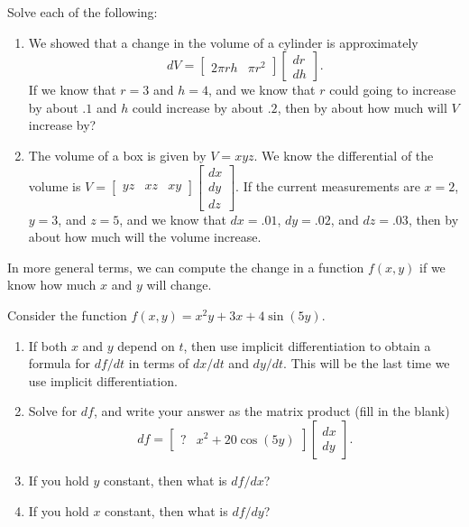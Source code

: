 \begin{problem}
Solve each of the following:
\begin{enumerate}
 \item{}%
 We showed that a change in the volume of a cylinder is approximately
 $$dV = \begin{bmatrix}2\pi rh& \pi r^2\end{bmatrix}\begin{bmatrix}dr\\dh\end{bmatrix}.$$ 
 If we know that $r=3$ and $h=4$, and we know that $r$ could going to increase by about $.1$ and $h$ could increase by about $.2$, then by about how much will $V$ increase by? 
 \item The volume of a box is given by $V=xyz$. We know the differential of the volume is $V=\begin{bmatrix}yz& xz & xy\end{bmatrix}\begin{bmatrix}dx\\dy\\dz\end{bmatrix}$. If the current measurements are $x=2$, $y=3$, and $z=5$, and we know that $dx=.01$, $dy=.02$, and $dz=.03$, then by about how much will the volume increase.  
\end{enumerate}
\end{problem}

In more general terms, we can compute the change in a function $f(x,y)$ if we know how much $x$ and $y$ will change. 

\begin{problem}
 Consider the function $f(x,y) = x^2y +3x+4\sin(5y)$.  
\begin{enumerate}
 \item If both $x$ and $y$ depend on $t$, then use implicit differentiation to obtain a formula for $df/dt$ in terms of $dx/dt$ and $dy/dt$. This will be the last time we use implicit differentiation.
 \item Solve for $df$, and write your answer as the matrix product (fill in the blank) 
 $$df = \begin{bmatrix}?& x^2+20\cos(5y)\end{bmatrix}\begin{bmatrix}dx\\dy\end{bmatrix}.$$ 
 \item If you hold $y$ constant, then what is $df/dx$? 
 \item If you hold $x$ constant, then what is $df/dy$? 
\end{enumerate}
\end{problem}

